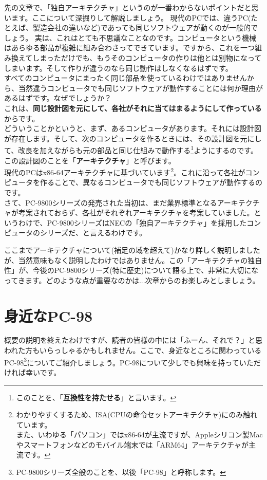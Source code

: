 \documentclass[b5paper,9pt,platex,dvipdfmx]{jsarticle}
\begin{document}
\begin{multicols*}{3}
先の文章で、「独自アーキテクチャ」というのが一番わからないポイントだと思います。ここについて深掘りして解説しましょう。
現代のPCでは、違うPC(たとえば、製造会社の違いなど)であっても同じソフトウェアが動くのが一般的でしょう。
実は、これはとても不思議なことなのです。コンピュータという機械はあらゆる部品が複雑に組み合わさってできています。ですから、これを一つ組み換えてしまっただけでも、もうそのコンピュータの作りは他とは別物になってしまいます。そして作りが違うのなら同じ動作はしなくなるはずです。\\
すべてのコンピュータにまったく同じ部品を使っているわけではありませんから、当然違うコンピュータでも同じソフトウェアが動作することには何か理由があるはずです。なぜでしょうか？\\
これは、{\bf 同じ設計図を元にして、各社がそれに当てはまるようにして作っている}からです。\\
どういうことかというと、まず、あるコンピュータがあります。それには設計図が存在します。そして、次のコンピュータを作るときには、その設計図を元にして、改良を加えながらも元の部品と同じ仕組みで動作する\footnote{このことを、「{\bf 互換性を持たせる}」と言います。}ようにするのです。この設計図のことを「{\bf アーキテクチャ}」と呼びます。\\
現代のPCはx86-64アーキテクチャに基づいています\footnote{わかりやすくするため、ISA(CPUの命令セットアーキテクチャ)にのみ触れています。\\また、いわゆる「パソコン」ではx86-64が主流ですが、Appleシリコン製Macやスマートフォンなどのモバイル端末では「ARM64」アーキテクチャが主流です。}。これに沿って各社がコンピュータを作ることで、異なるコンピュータでも同じソフトウェアが動作するのです。\\
さて、PC-9800シリーズの発売された当初は、まだ業界標準となるアーキテクチャが考案されておらず、各社がそれぞれアーキテクチャを考案していました。というわけで、PC-9800シリーズはNECの「独自アーキテクチャ」を採用したコンピュータのシリーズだ、と言えるわけです。

ここまでアーキテクチャについて(補足の域を超えて)かなり詳しく説明しましたが、当然意味もなく説明したわけではありません。この「アーキテクチャの独自性」が、今後のPC-9800シリーズ(特に歴史)について語る上で、非常に大切になってきます。どのような点が重要なのかは...次章からのお楽しみとしましょう。
\part{身近なPC-98}
\setcounter{section}{0}
概要の説明を終えたわけですが、読者の皆様の中には「ふーん、それで？」と思われた方もいらっしゃるかもしれません。ここで、身近なところに関わっているPC-98\footnote{PC-9800シリーズ全般のことを、以後「PC-98」と呼称します。}についてご紹介しましょう。PC-98について少しでも興味を持っていただければ幸いです。

\end{multicols*}
\end{document}
